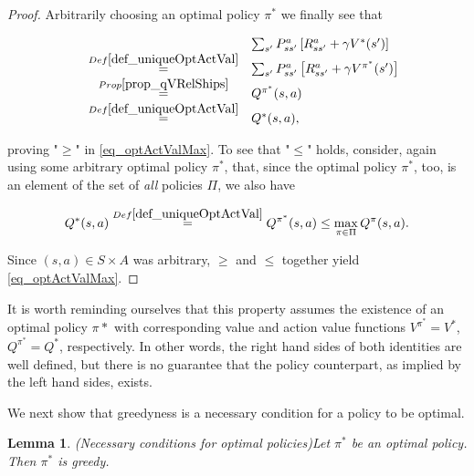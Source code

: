 \documentclass[11pt]{article} %
\newtheorem{lem}{Lemma}
\begin{document}
\begin{proof}
	Arbitrarily choosing an optimal policy $\pi^*$ we finally see that

	\begin{equation}
		\begin{array}{rcl}
			& & \sum_{s'} P_{ss'}^a \left[ R_{ss'}^a + \gamma V^*(s') \right] \\
			& \overset{Def \ref{def_uniqueOptActVal}}{=} & \sum_{s'} P_{ss'}^a \left[ R_{ss'}^a + \gamma V^{\pi^*}(s') \right] \\
			& \overset{Prop \ref{prop_qVRelShips}}{=} & Q^{\pi^*}(s,a) \\
			& \overset{Def \ref{def_uniqueOptActVal}}{=} & Q^*(s,a),
		\end{array}
	\end{equation}

	proving "$\ge$" in \ref{eq_optActValMax}. To see that "$\le$" holds, consider, again using some arbitrary optimal policy $\pi^*$, that, since the optimal policy $\pi^*$, too, is an element of the set of \textit{all} policies $\Pi$, we also have

	\begin{equation}
		Q^*(s,a) \overset{Def \ref{def_uniqueOptActVal}}{=} Q^{\pi^*}(s,a) \le \max_{\pi \in \Pi} Q^{\pi}(s,a).
	\end{equation}

	Since $(s,a) \in S \times A$ was arbitrary, $\ge$ and $\le$ together yield \ref{eq_optActValMax}.
\end{proof}

It is worth reminding ourselves that this property assumes the existence of an optimal policy $\pi*$ with corresponding value and action value functions $V^{\pi^*} = V^*$, $Q^{\pi^*}=Q^*$, respectively. In other words, the right hand sides of both identities are well defined, but there is no guarantee that the policy counterpart, as implied by the left hand sides, exists.

We next show that greedyness is a necessary condition for a policy to be optimal.

\begin{lem}{(Necessary conditions for optimal policies)}\label{lem_necOptCond}
	Let $\pi^*$ be an optimal policy. Then $\pi^*$ is greedy.
\end{lem}
\end{document}
